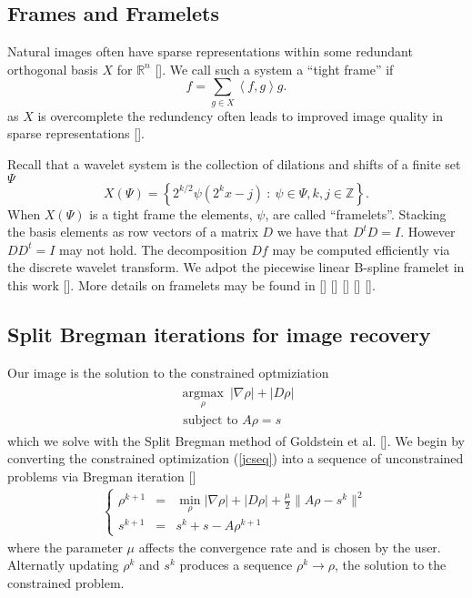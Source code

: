 \documentclass[11pt]{amsart}
\newcommand{\R}{\mathbb{R}}
\newcommand{\Z}{\mathbb{Z}}
\theoremstyle{remark}
\begin{document}
\subsection{Frames and Framelets}

Natural images often have sparse representations within some redundant orthogonal basis $X$ for $\R^n$ []. We call such a system a ``tight frame'' if
\begin{equation}
f = \sum_{g \in X} \left< f,g \right> g.
\end{equation}
as $X$ is overcomplete the redundency often leads to improved image quality in sparse representations [].

Recall that a wavelet system is the collection of dilations and shifts of a finite set $\Psi$
\begin{equation}
X(\Psi) = \left\{ 2^{k/2}\psi(2^kx-j) \: : \: \psi \in \Psi,k,j\in \Z \right\}.
\end{equation}
When $X(\Psi)$ is a tight frame the elements, $\psi$, are called ``framelets''. Stacking the basis elements as row vectors of a matrix $D$ we have that $D^tD = I$. However $DD^t = I$ may not hold. The decomposition $Df$ may be computed efficiently via the discrete wavelet transform. We adpot the piecewise linear B-spline framelet in this work []. More details on framelets may be found in [] [] [] [] [].


\subsection{Split Bregman iterations for image recovery}

Our image is the solution to the constrained optmiziation
\begin{align}\label{jcseq}
\begin{array}{c}
\underset{\rho}{\operatorname{argmax}} \:  | \nabla \rho| + | D \rho | \\
\text{ subject to } A \rho = s
\end{array}
\end{align}
which we solve with the Split Bregman method of Goldstein et al. []. We begin by converting the constrained optimization (\ref{jcseq}) into a sequence of unconstrained problems via Bregman iteration []
\begin{align}\label{gbregman}
\left\{
    \begin{array}{rcl}
\rho^{k+1} &=& \min_\rho | \nabla \rho| + | D \rho | + \frac{\mu}{2} \| A\rho - s^k \|^2 \\
s^{k+1} &=& s^k + s - A\rho^{k+1}
\end{array}
\right.
\end{align}
where the parameter $\mu$ affects the convergence rate and is chosen by the user. Alternatly updating $\rho^k$ and $s^k$ produces a sequence $\rho^k \rightarrow \rho$, the solution to the constrained problem.
\end{document}
